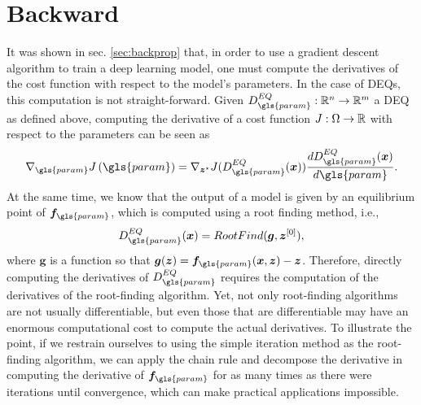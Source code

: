 \section{Backward}

It was shown in sec. \ref{sec:backprop} that, in order to use a gradient descent algorithm to train a deep learning model, one must compute the derivatives of the cost function with respect to the model's parameters.
In the case of \gls{DEQ}s, this computation is not straight-forward.
Given $D^{EQ}_{\gls{param}}:\R^{n}\to \R^{m}$ a \gls{DEQ} as defined above, computing the derivative of a cost function $J:\Omega\to \mathbb{R}$ with respect to the parameters can be seen as \[
    \nabla_{\gls{param}} J\left( \gls{param} \right) = \nabla_{\bm{z}^{\star}} J(D^{EQ}_{\gls{param}}(\bm{x})) \frac{d D^{EQ}_{\gls{param}}(\bm{x})}{d\gls{param}}
.\] 
At the same time, we know that the output of a model is given by an equilibrium point of $\bm{f}_{\gls{param}}$, which is computed using a root finding method, i.e., \[
    D^{EQ}_{\gls{param}}(\bm{x}) = RootFind(\bm{g}, \bm{z}^{[0]})
,\] where $\bm{g}$ is a function so that $\bm{g}(\bm{z}) = \bm{f}_{\gls{param}}(\bm{x},\bm{z}) - \bm{z}$.
Therefore, directly computing the derivatives of $D^{EQ}_{\gls{param}}$ requires the computation of the derivatives of the root-finding algorithm.
Yet, not only root-finding algorithms are not usually differentiable, but even those that are differentiable may have an enormous computational cost to compute the actual derivatives.
To illustrate the point, if we restrain ourselves to using the simple iteration method as the root-finding algorithm, we can apply the chain rule and decompose the derivative in computing the derivative of $\bm{f}_{\gls{param}}$ for as many times as there were iterations until convergence, which can make practical applications impossible.

